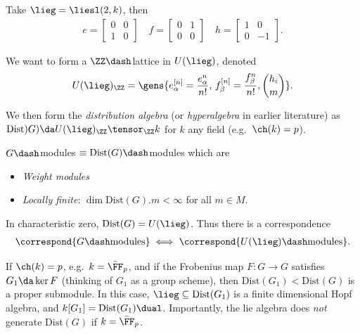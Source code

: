 \begin{example}

Take \(\lieg = \liesl(2, k)\), then
\begin{align*}  
e = \begin{bmatrix}
0 & 0 \\
1 & 0
\end{bmatrix}
\quad 
f = \begin{bmatrix}
0 & 1 \\
0 & 0
\end{bmatrix}
\quad
h = \begin{bmatrix}
1 & 0 \\
0 & -1
\end{bmatrix}
.\end{align*}

\end{example}

We want to form a \(\ZZ\dash\)lattice in \(U(\lieg)\), denoted
\begin{align*}  
U(\lieg)_\ZZ
=
\gens{
e_\alpha^{[n]} = {e_\alpha^n \over n!},\, f_\beta^{[n]} = {f_\beta^n \over n!}, {h_i \choose m}
}
.\end{align*}

We then form the \emph{distribution algebra} (or \emph{hyperalgebra} in
earlier literature) as
\(\mathrm{Dist})G) \da U(\lieg)_\ZZ \tensor_\ZZ k\) for \(k\) any field
(e.g.~\(\ch(k) = p\)).

\begin{theorem}[?]

\(G\dash\)modules \(\equiv \mathrm{Dist}(G)\dash\)modules which are

\begin{itemize}
\tightlist
\item
  \emph{Weight modules}
\item
  \emph{Locally finite}: \(\dim \mathrm{Dist}(G).m < \infty\) for all
  \(m\in M\).
\end{itemize}

\end{theorem}

\begin{remark}

In characteristic zero, \(\mathrm{Dist}(G) = U(\lieg)\). Thus there is a
correspondence
\begin{align*}  
\correspond{G\dash\text{modules}} \iff
\correspond{U(\lieg)\dash\text{modules}} 
.\end{align*}

If \(\ch(k) = p\), e.g.~\(k = \bar \FF_p\), and if the Frobenius map
\(F:G\to G\) satisfies \(G_1\da \ker F\) (thinking of \(G_1\) as a group
scheme), then \(\mathrm{Dist}(G_1) < \mathrm{Dist}(G)\) is a proper
submodule. In this case, \(\lieg \subseteq \mathrm{Dist}(G_1)\) is a
finite dimensional Hopf algebra, and
\(k[G_1] = \mathrm{Dist}(G_1)\dual\). Importantly, the lie algebra does
\emph{not} generate \(\mathrm{Dist}(G)\) if \(k = \bar\FF_p\).

\end{remark}

